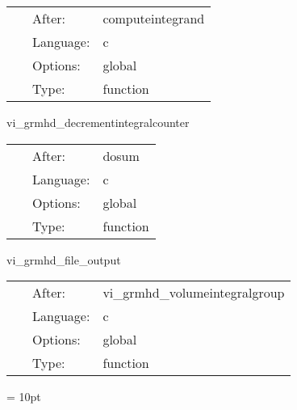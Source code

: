 \hspace{5mm}

 \begin{tabular*}{160mm}{cll} 
~ & After:  & computeintegrand \\ 
~ & Language:  & c \\ 
~ & Options:  & global \\ 
~ & Type:  & function \\ 
\end{tabular*} 


\vspace{5mm}


\hspace{5mm} vi\_grmhd\_decrementintegralcounter 

\hspace{5mm}{\it decrement integralcounter variable } 


\hspace{5mm}

 \begin{tabular*}{160mm}{cll} 
~ & After:  & dosum \\ 
~ & Language:  & c \\ 
~ & Options:  & global \\ 
~ & Type:  & function \\ 
\end{tabular*} 


\vspace{5mm}


\hspace{5mm} vi\_grmhd\_file\_output 

\hspace{5mm}{\it output volumeintegral results to disk } 


\hspace{5mm}

 \begin{tabular*}{160mm}{cll} 
~ & After:  & vi\_grmhd\_volumeintegralgroup \\ 
~ & Language:  & c \\ 
~ & Options:  & global \\ 
~ & Type:  & function \\ 
\end{tabular*} 



\vspace{5mm}\parskip = 10pt 

